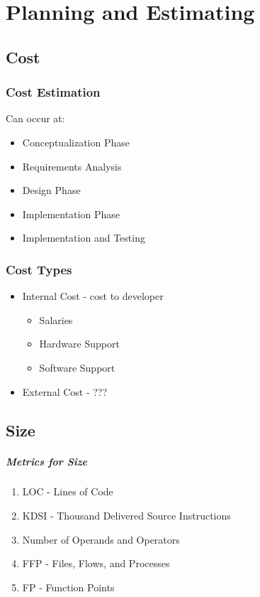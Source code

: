 \documentclass{report}
\begin{document}
	\chapter{Planning and Estimating}
		\section{Cost}
			\subsection{Cost Estimation}
				Can occur at:
					\begin{itemize}
						\item Conceptualization Phase
						\item Requirements Analysis
						\item Design Phase
						\item Implementation Phase
						\item Implementation and Testing
					\end{itemize}
			\subsection{Cost Types}
				\begin{itemize}
					\item Internal Cost - cost to developer
						\begin{itemize}
							\item Salaries
							\item Hardware Support
							\item Software Support
						\end{itemize}
					\item External Cost - ???
				\end{itemize}
		\section{Size}
			\paragraph{Metrics for Size}
				\begin{enumerate}
					\item LOC - Lines of Code
					\item KDSI - Thousand Delivered Source Instructions
					\item Number of Operands and Operators
					\item FFP - Files, Flows, and Processes
					\item FP - Function Points
				\end{enumerate}
\end{document}
